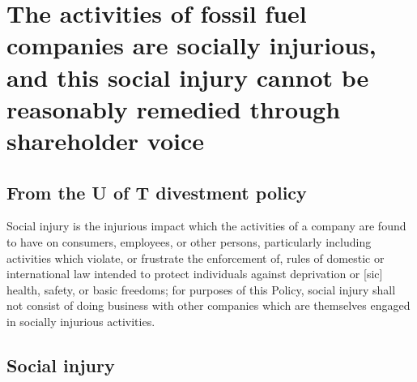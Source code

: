 \documentclass[10pt]{article}
\newenvironment{itquote}{%
  \quote
  \itshape
}{%
  \endquote
}
\begin{document}






		\singlespacing
		\section{The activities of fossil fuel companies are socially injurious, and this social injury cannot be reasonably remedied through shareholder voice}
		\label{sec:SocialInjury}
		\doublespacing






	\subsection{From the U of T divestment policy}



\begin{itquote}
Social injury is the injurious impact which the activities of a company are found to have on consumers, employees, or other persons, particularly including activities which violate, or frustrate the enforcement of, rules of domestic or international law intended to protect individuals against deprivation or [sic] health, safety, or basic freedoms; for purposes of this Policy, social injury shall not consist of doing business with other companies which are themselves engaged in socially injurious activities.
\end{itquote}



	\subsection{Social injury}
	\label{sec:SocialInjurysub}
\end{document}
